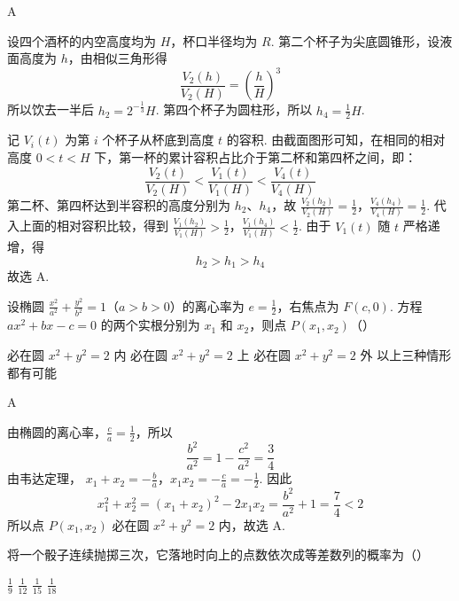 \begin{answer}
A
\end{answer}

\begin{solution}
设四个酒杯的内空高度均为 \(H\)，杯口半径均为 \(R\). 第二个杯子为尖底圆锥形，设液面高度为 \(h\)，由相似三角形得
\[
\frac{V_2(h)}{V_2(H)}=\left(\frac{h}{H}\right)^3
\]
所以饮去一半后 \(h_2=2^{-\frac{1}{3}}H\). 第四个杯子为圆柱形，所以 \(h_4=\frac12H\).

记 \(V_i(t)\) 为第 \(i\) 个杯子从杯底到高度 \(t\) 的容积. 由截面图形可知，在相同的相对高度 \(0<t<H\) 下，第一杯的累计容积占比介于第二杯和第四杯之间，即：
\[
\frac{V_2(t)}{V_2(H)}
<
\frac{V_1(t)}{V_1(H)}
<
\frac{V_4(t)}{V_4(H)}
\]
第二杯、第四杯达到半容积的高度分别为 \(h_2\)、\(h_4\)，故
\(\frac{V_2(h_2)}{V_2(H)}=\frac12\)，\(\frac{V_4(h_4)}{V_4(H)}=\frac12\).
代入上面的相对容积比较，得到
\(\frac{V_1(h_2)}{V_1(H)}>\frac12\)，\(\frac{V_1(h_4)}{V_1(H)}<\frac12\).
由于 \(V_1(t)\) 随 \(t\) 严格递增，得
\[
h_2>h_1>h_4
\]
故选 A.
\end{solution}

\begin{problem}
设椭圆 \(\frac{x^{2}}{a^{2}} + \frac{y^{2}}{b^{2}} = 1\)（\(a > b > 0\)）的离心率为 \(e = \frac{1}{2}\)，右焦点为 \(F(c, 0)\). 方程 \(ax^{2} + bx - c = 0\) 的两个实根分别为 \(x_{1}\) 和 \(x_{2}\)，则点 \(P(x_{1}, x_{2})\)（\quad）

\choices
    {必在圆 \(x^{2} + y^{2} = 2\) 内}
    {必在圆 \(x^{2} + y^{2} = 2\) 上}
    {必在圆 \(x^{2} + y^{2} = 2\) 外}
    {以上三种情形都有可能}
\end{problem}

\begin{answer}
A
\end{answer}

\begin{solution}
由椭圆的离心率，\(\frac{c}{a}=\frac{1}{2}\)，所以
\[
\frac{b^2}{a^2}=1-\frac{c^2}{a^2}=\frac34
\]
由韦达定理，
\(x_1+x_2=-\frac ba\)，\(x_1x_2=-\frac ca=-\frac12\).
因此
\[
x_1^2+x_2^2=(x_1+x_2)^2-2x_1x_2=\frac{b^2}{a^2}+1=\frac74<2
\]
所以点 \(P(x_1,x_2)\) 必在圆 \(x^2+y^2=2\) 内，故选 A.
\end{solution}

\begin{problem}
将一个骰子连续抛掷三次，它落地时向上的点数依次成等差数列的概率为（\quad）

\choices
    {\(\frac{1}{9}\)}
    {\(\frac{1}{12}\)}
    {\(\frac{1}{15}\)}
    {\(\frac{1}{18}\)}
\end{problem}

